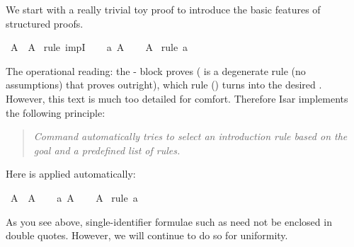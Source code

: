 %
\begin{isabellebody}%
\def\isabellecontext{Logic}%
%
\isadelimtheory
%
\endisadelimtheory
%
\isatagtheory
%
\endisatagtheory
{\isafoldtheory}%
%
\isadelimtheory
%
\endisadelimtheory
%
\isamarkuptrue%
%
\isamarkuptrue%
%
\isamarkuptrue%
%
\begin{isamarkuptext}%
We start with a really trivial toy proof to introduce the basic
features of structured proofs.%
\end{isamarkuptext}%
\isamarkuptrue%
\isamarkupfalse%
\ {\isachardoublequoteopen}A\ {\isasymlongrightarrow}\ A{\isachardoublequoteclose}\isanewline
%
\isadelimproof
%
\endisadelimproof
%
\isatagproof
{}\isamarkupfalse%
\ {\isacharparenleft}rule\ impI{\isacharparenright}\isanewline
\ \ \isamarkupfalse%
\ a{\isacharcolon}\ {\isachardoublequoteopen}A{\isachardoublequoteclose}\isanewline
\ \ \isamarkupfalse%
\ {\isachardoublequoteopen}A{\isachardoublequoteclose}\ \isamarkupfalse%
{\isacharparenleft}rule\ a{\isacharparenright}\isanewline
{}\isamarkupfalse%
%
\endisatagproof
{\isafoldproof}%
%
\isadelimproof
%
\endisadelimproof
%
\begin{isamarkuptext}%
\noindent
The operational reading: the -
block proves  ( is a degenerate rule (no
assumptions) that proves  outright), which rule
 () turns into the desired .  However, this text is much too detailed for comfort. Therefore
Isar implements the following principle: \begin{quote}\em Command
 automatically tries to select an introduction rule
based on the goal and a predefined list of rules.  \end{quote} Here
 is applied automatically:%
\end{isamarkuptext}%
\isamarkuptrue%
\isamarkupfalse%
\ {\isachardoublequoteopen}A\ {\isasymlongrightarrow}\ A{\isachardoublequoteclose}\isanewline
%
\isadelimproof
%
\endisadelimproof
%
\isatagproof
{}\isamarkupfalse%
\isanewline
\ \ \isamarkupfalse%
\ a{\isacharcolon}\ A\isanewline
\ \ \isamarkupfalse%
\ A\ \isamarkupfalse%
{\isacharparenleft}rule\ a{\isacharparenright}\isanewline
{}\isamarkupfalse%
%
\endisatagproof
{\isafoldproof}%
%
\isadelimproof
%
\endisadelimproof
%
\begin{isamarkuptext}%
\noindent As you see above, single-identifier formulae such as 
need not be enclosed in double quotes. However, we will continue to do so for
uniformity.


\end{isamarkuptext}
\end{isabellebody}
